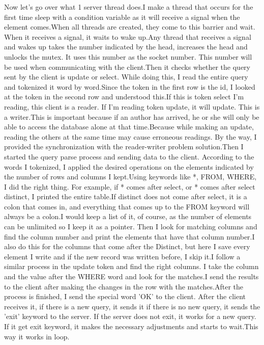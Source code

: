 \documentclass{article}
\begin{document}
Now let's go over what 1 server thread does.I make a thread that occurs for the first time sleep with a condition variable as it will receive a signal when the element comes.When all threads are created, they come to this barrier and wait. When it receives a signal, it waits to wake up.Any thread that receives a signal and wakes up takes the number indicated by the head, increases the head and unlocks the mutex. It uses this number as the socket number. This number will be used when communicating with the client.Then it checks whether the query sent by the client is update or select. While doing this, I read the entire query and tokenized it word by word.Since the token in the first row is the id, I looked at the token in the second row and understood this.If this is token select I'm reading, this client is a reader. If I'm reading token update, it will update. This is a writer.This is important because if an author has arrived, he or she will only be able to access the database alone at that time.Because while making an update, reading the others at the same time may cause erroneous readings. By the way, I provided the synchronization with the reader-writer problem solution.Then I started the query parse process and sending data to the client. According to the words I tokenized, I applied the desired operations on the elements indicated by the number of rows and columns I kept.Using keywords like *, FROM, WHERE, I did the right thing. For example, if * comes after select, or * comes after select distinct, I printed the entire table.If distinct does not come after select, it is a colon that comes in, and everything that comes up to the FROM keyword will always be a colon.I would keep a list of it, of course, as the number of elements can be unlimited so I keep it as a pointer. Then I look for matching columns and find the column number and print the elements that have that column number.I also do this for the columns that come after the Distinct, but here I save every element I write and if the new record was written before, I skip it.I follow a similar process in the update token and find the right columns. I take the column and the value after the WHERE word and look for the matches.I send the results to the client after making the changes in the row with the matches.After the process is finished, I send the special word 'OK' to the client. After the client receives it, if there is a new query, it sends it if there is no new query, it sends the 'exit' keyword to the server. If the server does not exit, it works for a new query. If it get exit keyword, it makes the necessary adjustments and starts to wait.This way it works in loop.
\end{document}
